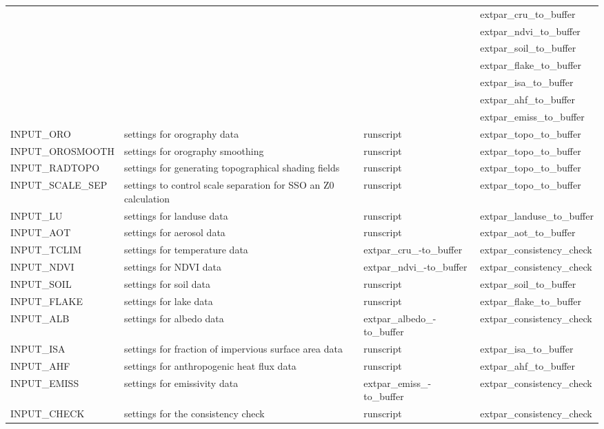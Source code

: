 \documentclass[a4paper,10pt,DIV14,BCOR1cm,titlepage,twoside]{scrartcl}
\providecommand{\tabularnewline}{\\}
\begin{document}
\begin{longtable}{|p{3.5cm}|p{4.8cm}|p{2.4cm}|p{3.8cm}|}
 & & & extpar\_cru\_to\_buffer \\ 
 & & & extpar\_ndvi\_to\_buffer \\
 & & & extpar\_soil\_to\_buffer \\
 & & & extpar\_flake\_to\_buffer \\
 & & & extpar\_isa\_to\_buffer \\
 & & & extpar\_ahf\_to\_buffer \\
 & & & extpar\_emiss\_to\_buffer \\
\hline 
 INPUT\_ORO & settings for orography data & runscript & extpar\_topo\_to\_buffer \\
\hline
 INPUT\_OROSMOOTH & settings for orography smoothing & runscript & extpar\_topo\_to\_buffer \\
\hline 
 INPUT\_RADTOPO & settings for generating topographical shading fields & runscript & extpar\_topo\_to\_buffer \\
\hline 
 INPUT\_SCALE\_SEP & settings to control scale separation for SSO an Z0 calculation & runscript & extpar\_topo\_to\_buffer \\
\hline 
 INPUT\_LU & settings for landuse data & runscript &  extpar\_landuse\_to\_buffer \\
\hline 
 INPUT\_AOT & settings for aerosol data  & runscript &  extpar\_aot\_to\_buffer \\
\hline
  INPUT\_TCLIM  & settings for temperature data     &  extpar\_cru\_-to\_buffer & extpar\_consistency\_check \tabularnewline
\hline 
INPUT\_NDVI & settings for NDVI data & extpar\_ndvi\_-to\_buffer & extpar\_consistency\_check \tabularnewline
\hline 
INPUT\_SOIL & settings for soil data & runscript & extpar\_soil\_to\_buffer \\
\hline 
INPUT\_FLAKE & settings for lake data & runscript & extpar\_flake\_to\_buffer \\
\hline
INPUT\_ALB & settings for albedo data & extpar\_albedo\_-to\_buffer & extpar\_consistency\_check \tabularnewline
\hline
INPUT\_ISA & settings for fraction of impervious surface area data & runscript & extpar\_isa\_to\_buffer \\
\hline
INPUT\_AHF & settings for anthropogenic heat flux data & runscript & extpar\_ahf\_to\_buffer \\
\hline
INPUT\_EMISS & settings for emissivity data & extpar\_emiss\_-to\_buffer & extpar\_consistency\_check \tabularnewline
\hline
INPUT\_CHECK & settings for the consistency check & runscript & extpar\_consistency\_check \\
\hline 
\bottomrule
\end{longtable}
\end{document}
